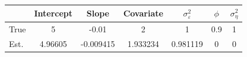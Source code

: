 \begin{tabular}{lcccccc}
\toprule
& Intercept & Slope & Covariate & $\sigma_\varepsilon^2$ & $\phi$ & $\sigma_\eta^2$ \\
\midrule
True & 5 & -0.01 & 2 & 1 & 0.9 & 1 \\
\midrule
Est. & 4.96605 & -0.009415 & 1.933234 & 0.981119 & 0 & 0 \\
\bottomrule
\end{tabular}
